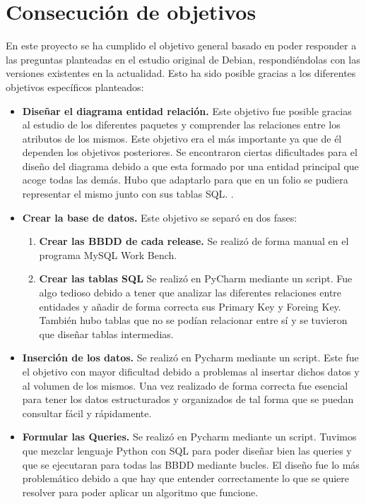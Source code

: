 \documentclass[a4paper, 12pt]{book}
\begin{document}
\section{Consecución de objetivos}
\label{sec:consecucion-objetivos}

En este proyecto se ha cumplido el objetivo general basado en poder responder a las preguntas planteadas en el estudio original de Debian, respondiéndolas con las versiones existentes en la actualidad. Esto ha sido posible gracias a los diferentes objetivos específicos planteados:

\begin{itemize}
	\item \textbf {Diseñar el diagrama entidad relación.} Este objetivo fue posible gracias al estudio de los diferentes paquetes y comprender las relaciones entre los atributos de los mismos. Este objetivo era el más importante ya que de él dependen los objetivos posteriores.
	Se encontraron ciertas dificultades para el diseño del diagrama debido a que esta formado por una entidad principal que acoge todas las demás. Hubo que adaptarlo para que en un folio se pudiera representar el mismo junto con sus tablas SQL.
	.
	\item \textbf {Crear la base de datos.} Este objetivo se separó en dos fases:
	\begin{enumerate}
		
		\item \textbf{Crear las BBDD de cada release.} Se realizó de forma manual en el programa MySQL Work Bench.
		
		\item \textbf{Crear las tablas SQL} Se realizó en PyCharm mediante un script. Fue algo tedioso debido a tener que analizar las diferentes relaciones entre entidades y añadir de forma correcta sus Primary Key y Foreing Key. También hubo tablas que no se podían relacionar entre sí y se tuvieron que diseñar tablas intermedias.
		
	\end{enumerate}
	\item \textbf {Inserción de los datos.} Se realizó en Pycharm mediante un script. Este fue el objetivo con mayor dificultad debido a problemas al insertar dichos datos y al volumen de los mismos. Una vez realizado de forma correcta fue esencial para tener los datos estructurados y organizados de tal forma que se puedan consultar fácil y rápidamente.
	
	\item \textbf {Formular las Queries.} Se realizó en Pycharm mediante un script. Tuvimos que mezclar lenguaje Python con SQL para poder diseñar bien las queries y que se ejecutaran para todas las BBDD mediante bucles. El diseño fue lo más problemático debido a que hay que entender correctamente lo que se quiere resolver para poder aplicar un algoritmo que funcione. 
	

\end{itemize}
\end{document}
